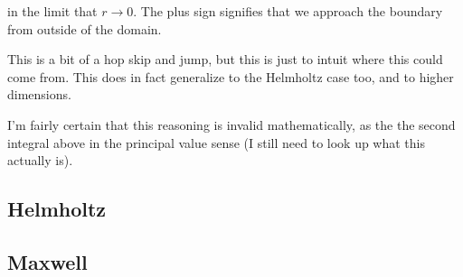 \documentclass[12pt, a4, twoside]{article}
\begin{document}
in the limit that $r \rightarrow 0$. The plus sign signifies that we approach the boundary from outside of the domain.

This is a bit of a hop skip and jump, but this is just to intuit where this could come from. This does in fact generalize to the Helmholtz case too, and to higher dimensions.

I'm fairly certain that this reasoning is invalid mathematically, as the the second integral above in the principal value sense (I still need to look up what this actually is).

\subsection{Helmholtz}

\subsection{Maxwell}


\printbibliography[heading=bibintoc]
\end{document}
